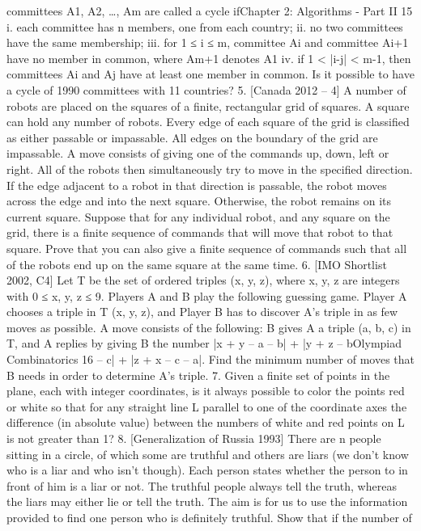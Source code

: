 \documentclass[a4paper,11pt]{book}
\begin{document}
committees A1, A2, …, Am are called a cycle ifChapter 2: Algorithms - Part II 15
i. each committee has n members, one from each country;
ii. no two committees have the same membership;
iii. for 1 ≤ i ≤ m, committee Ai and committee Ai+1 have no
member in common, where Am+1 denotes A1
iv. if 1 < |i-j| < m-1, then committees Ai and Aj have at least
one member in common.
Is it possible to have a cycle of 1990 committees with 11
countries?
5. [Canada 2012 – 4]
A number of robots are placed on the squares of a finite,
rectangular grid of squares. A square can hold any number of
robots. Every edge of each square of the grid is classified as
either passable or impassable. All edges on the boundary of
the grid are impassable. A move consists of giving one of the
commands up, down, left or right. All of the robots then
simultaneously try to move in the specified direction. If the
edge adjacent to a robot in that direction is passable, the robot
moves across the edge and into the next square. Otherwise,
the robot remains on its current square.
Suppose that for any individual robot, and any square on
the grid, there is a finite sequence of commands that will move
that robot to that square. Prove that you can also give a finite
sequence of commands such that all of the robots end up on
the same square at the same time.
6. [IMO Shortlist 2002, C4]
Let T be the set of ordered triples (x, y, z), where x, y, z are
integers with 0 ≤ x, y, z ≤ 9. Players A and B play the following
guessing game. Player A chooses a triple in T (x, y, z), and
Player B has to discover A’s triple in as few moves as possible.
A move consists of the following: B gives A a triple (a, b, c) in T,
and A replies by giving B the number |x + y – a – b| + |y + z – bOlympiad Combinatorics 16
– c| + |z + x – c – a|. Find the minimum number of moves that B
needs in order to determine A’s triple.
7. Given a finite set of points in the plane,
each with integer coordinates, is it always possible to color
the points red or white so that for any straight line L parallel
to one of the coordinate axes the difference (in absolute value)
between the numbers of white and red points on L is not
greater than 1?
8. [Generalization of Russia 1993]
There are n people sitting in a circle, of which some are
truthful and others are liars (we don’t know who is a liar and
who isn’t though). Each person states whether the person to
in front of him is a liar or not. The truthful people always tell
the truth, whereas the liars may either lie or tell the truth. The
aim is for us to use the information provided to find one
person who is definitely truthful. Show that if the number of
\end{document}
